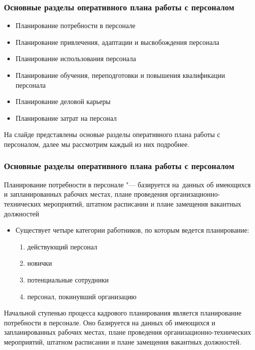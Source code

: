 \documentclass{../industrial-development}
\begin{document}
\begin{frame} \frametitle{Основные разделы оперативного плана работы с персоналом}

  \begin{itemize}


 \item Планирование потребности в персонале
\item Планирование привлечения, адаптации и высвобождения персонала
\item  Планирование использования персонала
\item  Планирование обучения, переподготовки и повышения квалификации персонала
\item Планирование деловой карьеры
\item Планирование затрат на персонал
	  \end{itemize}	  

\end{frame}

\lecturenotes

На слайде представлены основые разделы оперативного плана работы с персоналом, далее мы рассмотрим каждый из них подробнее.


\begin{frame} \frametitle{Основные разделы оперативного плана работы с персоналом}
\alert{Планирование потребности в персонале} "--- базируется на~данных об имеющихся и запланированных рабочих местах, плане проведения организационно-технических мероприятий, штатном расписании и плане замещения вакантных должностей
  \begin{itemize}
	\item Существует четыре категории работников, по которым ведется планирование:
	  \begin{enumerate}
	\item	действующий персонал
	\item	новички
	\item	потенциальные сотрудники
	\item	персонал, покинувший организацию
	  \end{enumerate}

	  \end{itemize}

\end{frame}

\lecturenotes

Начальной ступенью процесса кадрового планирования является планирование потребности в персонале. Оно базируется на данных об имеющихся и запланированных рабочих местах, плане проведения организационно-технических мероприятий, штатном расписании и плане замещения вакантных должностей.
\end{document}
